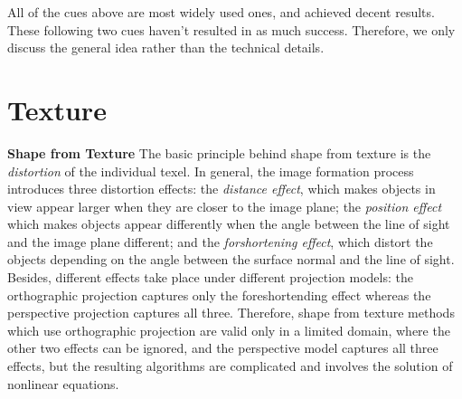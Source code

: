 
All of the cues above are most widely used ones, and achieved decent results. These following two cues haven't resulted in as much success. Therefore, we only discuss the general idea rather than the technical details.

\section{Texture}
\textbf{Shape from Texture}
The basic principle behind shape from texture is the \textit{distortion} of the individual texel. In general, the image formation process introduces three distortion effects: the \textit{distance effect}, which makes objects in view appear larger when they are closer to the image plane; the \textit{position effect} which makes objects appear differently when the angle between the line of sight and the image plane different; and the \textit{forshortening effect}, which distort the objects depending on the angle between the surface normal and the line of sight. Besides, different effects take place under different projection models: the orthographic projection captures only the foreshortending effect whereas the perspective projection captures all three. Therefore, shape from texture methods which use orthographic projection are valid only in a limited domain, where the other two effects can be ignored, and the perspective model captures all three effects, but the resulting algorithms are complicated and involves the solution of nonlinear equations.

